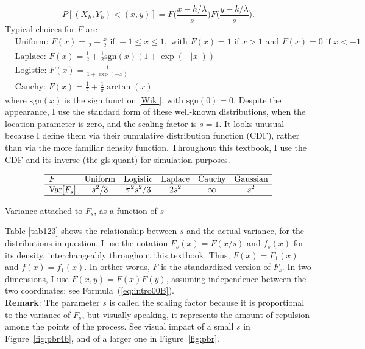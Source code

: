 \documentclass[10pt]{article}
\begin{document}
\begin{equation}
P[(X_h,Y_k)<(x,y)]=F\Big(\frac{x-h/\lambda}{s}\Big)F\Big(\frac{y-k/\lambda}{s}\Big).             \label{eq:intro00B}
\end{equation}
Typical choices for $F$ are
\begin{align}
 & \mbox{Uniform: } F(x) =  \frac{1}{2}+\frac{x}{2} \mbox{ if } -1\leq x \leq 1, \mbox{ with } F(x)=1 \mbox{ if } x>1 \mbox{ and } F(x)=0 \mbox{ if } x < -1 \nonumber\\
 & \mbox{Laplace: } F(x) = \frac{1}{2}+\frac{1}{2} \mbox{sgn}(x)(1+\exp(-|x|))\nonumber \\
& \mbox{Logistic: } F(x) = \frac{1}{1+\exp(-x)}\nonumber\\
& \mbox{Cauchy: } F(x) = \frac{1}{2}+\frac{1}{\pi}\arctan(x) \nonumber
\end{align}
where $\mbox{sgn}(x)$ is the sign function [\href{https://en.wikipedia.org/wiki/Sign_function}{Wiki}], with $\mbox{sgn}(0)=0$. Despite the appearance, I use the standard form of these well-known distributions, when the location parameter is zero, and the scaling factor is $s=1$. It looks unusual because I define them via their cumulative distribution function 
(CDF),  %
rather than via the more familiar density function. Throughout this textbook, I use the CDF and its inverse (the \gls{gls:quant}) for simulation purposes.


\begin{table}[H]
\[
\begin{array}{lccccc}
\hline
 F &  \mbox{Uniform} & \mbox{Logistic} & \mbox{Laplace} & \mbox{Cauchy} & \mbox{Gaussian} \\
\hline
 \mbox{Var}[F_s] & s^2/3 & \pi^2 s^2/3 & 2s^2 & \infty &  s^2 \\
\hline
\end{array}
\]
\caption{\label{tab123}Variance attached to $F_s$, as a function of $s$}
\end{table}
Table \ref{tab123} shows the relationship between $s$ and the actual variance, for the distributions in question. I use the notation $F_s(x)=F(x/s)$ and $f_s(x)$ for its density,  
interchangeably throughout this textbook. Thus, $F(x)=F_1(x)$ and $f(x)=f_1(x)$. In orther words, $F$ is the standardized version of $F_s$. In two dimensions, I use $F(x,y)=F(x)F(y)$, assuming independence between the two coordinates: see Formula~(\ref{eq:intro00B}). \vspace{1ex} \\
{\bf Remark}: The parameter $s$ is called the scaling factor because it is proportional to the variance of $F_s$, but visually speaking, it represents the amount of repulsion among the points of the process. See visual impact of a small $s$ in Figure~\ref{fig:pbr4b}, and of a larger one in Figure~\ref{fig:pbr}.  
\end{document}
